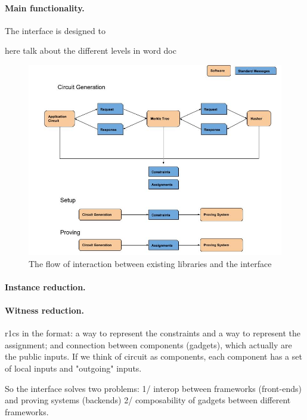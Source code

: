 \documentclass[a4paper,11pt]{article}
\begin{document}
	\paragraph{Main functionality.}
	
	The interface is designed to  
	
	here talk about the different levels in word doc
	
	
		\begin{figure}[h!]
			\includegraphics[width=\linewidth]{flow.jpg}
			\caption{The flow of interaction between existing libraries and the interface}
			\label{flow}
		\end{figure}
	
	\paragraph{Instance reduction.} 
	
	
	\paragraph{Witness reduction.}
	
	r1cs in the format: a way to represent the constraints and a way to represent the assignment; and connection between components (gadgets), which actually are the public inputs. If we think of circuit as components, each component has a set of local inputs and "outgoing" inputs.
	
	So the interface solves two problems: 1/ interop between frameworks (front-ends) and proving systems (backends) 2/ composability of gadgets between different frameworks.
	
\end{document}
